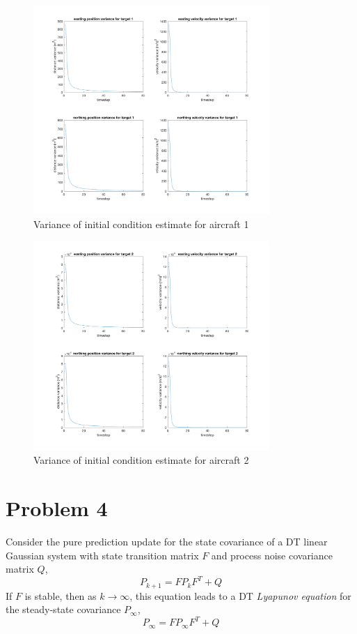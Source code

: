 \documentclass[11pt]{article}
\begin{document}
\begin{figure}[h]
	\centering
	\includegraphics[width=0.8\textwidth]{prob3c_plt3.png}
	\caption{Variance of initial condition estimate for aircraft 1}
	\label{sigmaA}
\end{figure}
\begin{figure}[h]
	\centering
	\includegraphics[width=0.8\textwidth]{prob3c_plt4.png}
	\caption{Variance of initial condition estimate for aircraft 2}
	\label{sigmaB}
\end{figure}

\section*{Problem 4}
Consider the pure prediction update for the state covariance of a DT linear Gaussian system with state transition matrix $F$ and process noise covariance matrix $Q$,
\begin{equation*}
	P_{k+1} = FP_kF^T + Q
\end{equation*}
If $F$ is stable, then as $k\rightarrow \infty$, this equation leads to a DT \textit{Lyapunov equation} for the steady-state covariance $P_\infty$,
\begin{equation*}
	P_\infty=FP_\infty F^T + Q
\end{equation*}
\end{document}
